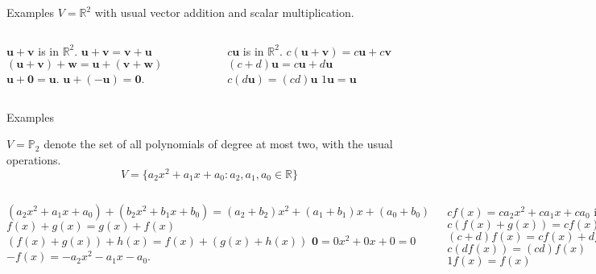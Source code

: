 \documentclass[xcolor=dvipsnames,aspectratio=169,t]{beamer}
\begin{document}
\begin{frame}{Examples}
$V = \mathbb{R}^2$ with usual vector addition and scalar multiplication.

\begin{columns}[T]

\column{0.5\tw}

\bb
\ii $\mathbf{u} + \mathbf{v}$ is in $\mathbb{R}^2$. \ms
\ii $\mathbf{u} + \mathbf{v} = \mathbf{v} + \mathbf{u}$ \ms
\ii $(\mathbf{u} + \mathbf{v}) + \mathbf{w} = \mathbf{u} + (\mathbf{v} + \mathbf{w})$ \ms
\ii $\mathbf{u} + \mathbf{0} = \mathbf{u}$. \ms
\ii $\mathbf{u} + (- \mathbf{u}) = \mathbf{0}$. \ms
\ee

\column{0.5\tw}

\bb
\addtocounter{enumi}{5}
\ii $c \mathbf{u}$ is in $\mathbb{R}^2$. \ms
\ii $c( \mathbf{u} + \mathbf{v} ) = c \mathbf{u} + c \mathbf{v}$ \ms
\ii $(c+d)  \mathbf{u} = c \mathbf{u} + d \mathbf{u}$ \ms
\ii $c (d \mathbf{u}) = (cd) \mathbf{u}$ \ms
\ii $1 \mathbf{u} = \mathbf{u}$ \ms
\ee

\end{columns}

\vspace{2in}

\end{frame}


\begin{frame}{Examples}


$V = \mathbb{P}_2$ denote the set of all polynomials of degree at most two, with the usual operations.
\[ V = \{a_2 x^2 + a_1 x + a_0 : a_2,a_1,a_0 \in \mathbb{R} \}\]

\pause
\begin{columns}[T]

\column{0.5\tw}

\bb
\ii $(a_2x^2+a_1x+a_0) + (b_2x^2+b_1x+b_0) = (a_2+b_2)x^2+(a_1+b_1)x+(a_0+b_0)$ \ms
\ii $f(x) + g(x) = g(x)+f(x)$ \ms
\ii $(f(x) + g(x)) + h(x)  = f(x)+(g(x)+h(x))$ \ms
\ii  $\mathbf{0} = 0x^2+0x+0= 0$ \ms
\ii $- f(x) = -a_2x^2-a_1x-a_0$. \ms
\ee

\column{0.5\tw}

\bb
\addtocounter{enumi}{5}
\ii $c f(x) = ca_2x^2+ca_1x+ca_0$ in  $\mathbb{P}_2$ \vspace{0.3in}
\ii $c( f(x) + g(x)) = cf(x)+cg(x)$ \ms
\ii $(c+d) f(x) = cf(x) + df(x)$ \vspace{0.25in}
\ii $c (d f(x)) = (cd) f(x)$ \ms
\ii $1 f(x) = f(x)$ \ms
\ee


\end{columns}

\vspace{2in}

\end{frame}
\end{document}
